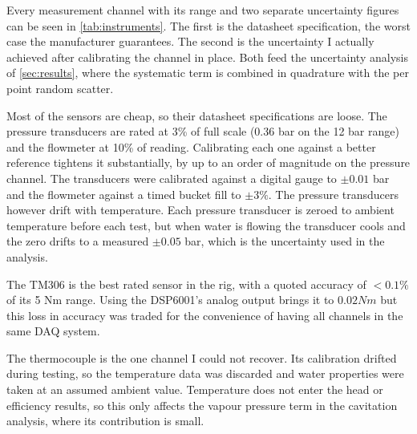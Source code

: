 

Every measurement channel with its range and two separate uncertainty figures can be seen in \cref{tab:instruments}. The first is the datasheet specification, the worst case the manufacturer guarantees. The second is the uncertainty I actually achieved after calibrating the channel in place. Both feed the uncertainty analysis of \cref{sec:results}, where the systematic term is combined in quadrature with the per point random scatter.

Most of the sensors are cheap, so their datasheet specifications are loose. The pressure transducers are rated at 3\% of full scale (0.36 bar on the 12 bar
range) and the flowmeter at 10\% of reading. Calibrating each one against a better reference tightens it substantially, by up to an order of magnitude on the
pressure channel. The transducers were calibrated against a digital gauge to $\pm 0.01$ bar and the flowmeter against a timed bucket fill to $\pm 3\%$. The pressure transducers however drift with temperature. Each pressure transducer is zeroed to ambient temperature before each test, but when water is flowing the transducer cools and the zero drifts to a measured $\pm 0.05$ bar, which is the uncertainty used in the analysis.


The TM306 is the best rated sensor in the rig, with a quoted accuracy of $<0.1\%$ of its 5 Nm range. Using the DSP6001's analog output brings it to $0.02 Nm$ but this loss in accuracy was traded for the convenience of having all channels in the same DAQ system. 


The thermocouple is the one channel I could not recover. Its calibration drifted during testing, so the temperature data was discarded and water properties were taken at an assumed ambient value. Temperature does not enter the head or efficiency results, so this only affects the vapour pressure term in the cavitation analysis, where its contribution is small.

